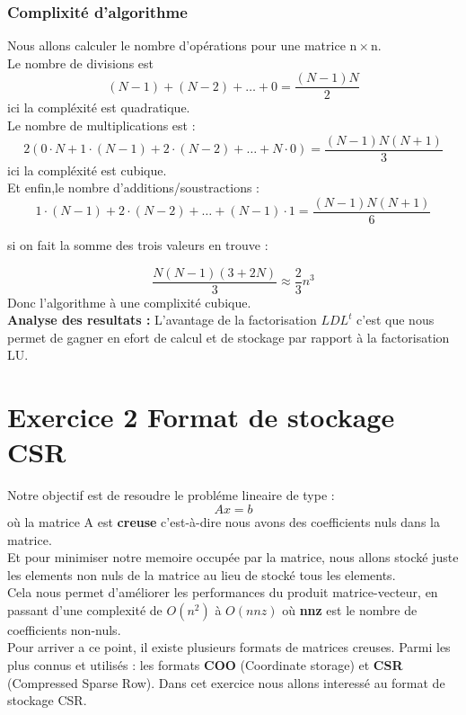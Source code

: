\documentclass[12pt]{report}
\begin{document}
\subsubsection{Complixité d'algorithme}

Nous allons calculer le nombre d'opérations pour une matrice $\mathrm{n} \times \mathrm{n}$.\\

Le nombre de divisions est
$$
(N-1)+(N-2)+\ldots+0=\frac{(N-1) N}{2}
$$
ici la compléxité est quadratique.\\

Le nombre de multiplications est :\\
$$
2(0 \cdot N+1 \cdot(N-1)+2 \cdot(N-2)+\ldots+N \cdot 0)=\frac{(N-1) N(N+1)}{3}
$$
ici la compléxité est cubique.\\


Et enfin,le nombre d'additions/soustractions :
$$
1 \cdot(N-1)+2 \cdot(N-2)+\ldots+(N-1) \cdot 1=\frac{(N-1) N(N+1)}{6}
$$

si on fait la somme des trois valeurs en trouve :

$$\frac{N(N-1)(3+2N)}{3}
\approx \frac{2}{3} n^{3}$$
Donc l'algorithme à une complixité cubique.\\[0.1cm]

\textbf{Analyse des resultats :}
L'avantage de la factorisation $LDL^t$ c'est que nous permet de gagner en efort de calcul et de stockage par rapport à la factorisation LU.

\section{Exercice 2 Format de stockage CSR}

Notre objectif est de resoudre le probléme lineaire de type :
$$ Ax=b$$ où la matrice A est \textbf{creuse} c’est-à-dire nous avons des coefficients nuls dans la matrice.\\
Et pour minimiser notre memoire occupée par la matrice, nous allons stocké juste les elements non nuls de la matrice au lieu de stocké tous les elements.\\

Cela nous permet d'améliorer les performances du produit matrice-vecteur, en passant d’une complexité de $O(n^2)$ à $O(nnz)$ où \textbf{nnz} est le nombre de coefficients non-nuls.\\

Pour arriver a ce point, il existe plusieurs formats de matrices creuses. Parmi les plus connus et utilisés : les formats \textbf{COO} (Coordinate storage) et \textbf{CSR} (Compressed Sparse Row).
Dans cet exercice nous allons interessé au format de stockage CSR.
\end{document}
